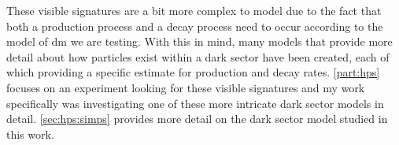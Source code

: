 These visible signatures are a bit more complex to model due to the fact that both a production process
and a decay process need to occur according to the model of \ac{dm} we are testing. With this in mind,
many models that provide more detail about how particles exist within a dark sector have been
created, each of which providing a specific estimate for production and decay rates.
\cref{part:hps} focuses on an experiment looking for these visible signatures and my work
specifically was investigating one of these more intricate dark sector models in detail.
\cref{sec:hps:simps} provides more detail on the dark sector model studied in this work.